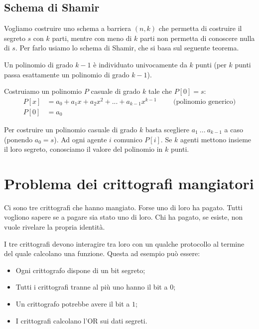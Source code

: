 \subsection{Schema di Shamir}
Vogliamo costruire uno schema a barriera  $(n, k)$ che permetta di costruire il segreto $s$ con $k$ parti, mentre con meno di $k$ parti non permetta di conoscere nulla di $s$. Per farlo usiamo lo schema di Shamir, che si basa sul seguente teorema.
 
\begin{theorem}
    Un polinomio di grado $k-1$ è individuato univocamente da $k$ punti (per $k$ punti passa esattamente un polinomio di grado $k-1$).
\end{theorem}

\noindent Costruiamo un polinomio $P$ casuale di grado $k$ tale che $P[0] = s$:
\begin{align*}
    P[x] &= a_0 + a_1x + a_2x^2 + ... + a_{k-1}x^{k-1} \hspace{1cm} \text{(polinomio generico)}\\
    P[0] &=a_0
\end{align*}

\noindent Per costruire un polinomio casuale di grado $k$ basta scegliere $a_1 \ ... \ a_{k-1}$ a caso (ponendo $a_0 = s$). Ad ogni agente $i$ comunico $P[i]$. Se $k$ agenti mettono insieme il loro segreto, conosciamo il valore del polinomio in $k$ punti.

\section{Problema dei crittografi mangiatori}
Ci sono tre crittografi che hanno mangiato. Forse uno di loro ha pagato. Tutti vogliono sapere se a pagare sia stato uno di loro. Chi ha pagato, se esiste, non vuole rivelare la propria identità. 

I tre crittografi devono interagire tra loro con un qualche protocollo al termine del quale calcolano una funzione. Questa ad esempio può essere: 
\begin{itemize}
    \item Ogni crittografo dispone di un bit segreto;
    \item Tutti i crittografi tranne al più uno hanno il bit a $0$;
    \item Un crittografo potrebbe avere il bit a $1$;
    \item I crittografi calcolano l'OR sui dati segreti.
\end{itemize}


